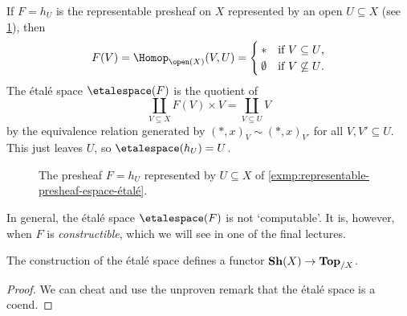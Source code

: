 \begin{exmp}\label{exmp:representable-presheaf-espace-étalé}
If $F = h_U$ is the representable presheaf on $X$ represented by an open $U\subseteq X$ (see \cref{fig:presheaf-represented-by-U}), then
\[ F(V) = \Hom[\open(X)](V,U) = \begin{cases}
    \terminal & \text{if } V\subseteq U\text{,} \\
    \emptyset & \text{if } V\not\subseteq U\text{.}
\end{cases}\]
The étalé space $\etalespace(F)$ is the quotient of
\[ \coprod_{V\subseteq X} F(V)\times V = \coprod_{V\subseteq U} V \]
by the equivalence relation generated by $(*,x)_V\sim(*,x)_{V'}$ for all $V,V'\subseteq U$.
This just leaves $U$, so $\etalespace(h_U) = U$.
\end{exmp}

\begin{figure}
    \centering
    \caption{The presheaf $F = h_U$ represented by $U\subseteq X$ of \cref{exmp:representable-presheaf-espace-étalé}.}
    \label{fig:presheaf-represented-by-U}
\end{figure}

\begin{rmk}
In general, the étalé space $\etalespace(F)$ is not `computable'.
It is, however, when $F$ is \emph{constructible}, which we will see in one of the final lectures.
\end{rmk}

\begin{prop}
    The construction of the étalé space defines a functor
    $\operatorname{\mathbf{Sh}}(X) \to \mathbf{Top}_{/X}$.
\end{prop}
\begin{proof}
    We can cheat and use the unproven remark that the étalé space is a coend. 
\end{proof}
